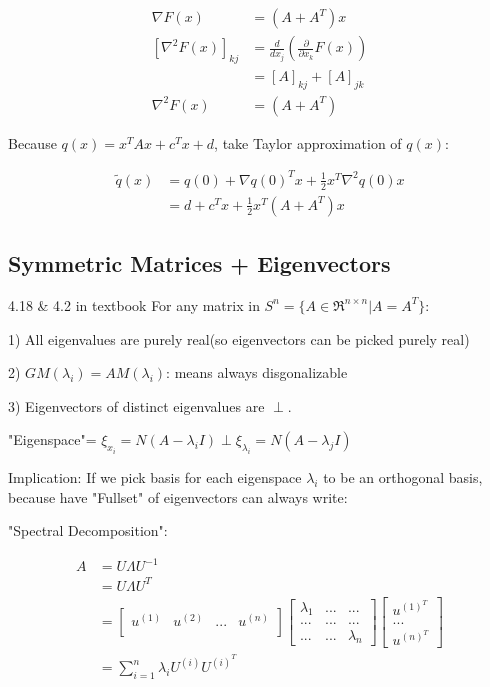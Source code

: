 \begin{align*}
\nabla F(x) &= (A + A^T)x\\
[\nabla^2F(x)]_{kj} &= \frac{d}{dx_j}(\frac{\partial}{\partial x_k}F(x))\\
&= [A]_{kj} + [A]_{jk}\\
\nabla^2F(x) &= (A + A^T)
\end{align*}

Because $q(x) = x^TAx + c^Tx + d$, take Taylor approximation of $q(x)$:

\begin{align*}
\tilde{q}(x) &= q(0) + \nabla q(0)^Tx + \frac{1}{2}x^T\nabla^2q(0)x\\
&= d + c^Tx + \frac{1}{2}x^T(A + A^T)x
\end{align*}

\subsection{Symmetric Matrices + Eigenvectors}

\begin{theorem}{4.18 \& 4.2 in textbook}
	For any matrix in $S^n = \{A\in \Re^{n\times n} | A = A^T \}$:
	
	1) All eigenvalues are purely real(so eigenvectors can be picked purely real)
	
	2) $GM(\lambda_i) = AM(\lambda_i)$: means always disgonalizable
	
	3) Eigenvectors of distinct eigenvalues are $\perp$.
	
	"Eigenspace"= $\xi_{x_i} = N(A - \lambda_iI)\perp \xi_{\lambda_i} = N(A - \lambda_jI)$
\end{theorem}

Implication: If we pick basis for each eigenspace $\lambda_i$ to be an orthogonal basis, because have "Fullset" of eigenvectors can always write:

"Spectral Decomposition":

\begin{align*}
A &= U\Lambda U^{-1}\\
&= U\Lambda U^{T}\\
&= 
\begin{bmatrix}%
u^{(1)} & u^{(2)} & ... & u^{(n)}\\
\end{bmatrix}
\begin{bmatrix}%
\lambda_1 & ... & ...\\
... & ... & ...\\
... & ... & \lambda_n
\end{bmatrix}
\begin{bmatrix}%
u^{(1)^T}\\
...\\
u^{(n)^T}
\end{bmatrix}\\
&= \sum^n_{i=1}\lambda_iU^{(i)}U^{(i)^T}
\end{align*}

